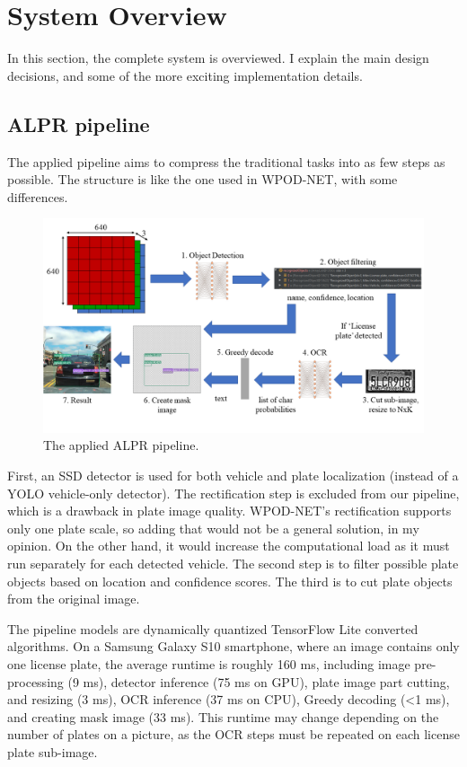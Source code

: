 \chapter{System Overview}

In this section, the complete system is overviewed. I explain the main design decisions, and some of the more exciting implementation details.

\section{ALPR pipeline}

The applied pipeline aims to compress the traditional tasks into as few steps as possible. The structure is like the one used in WPOD-NET\cite{WPOD-NET}, with some differences.

\begin{figure}[htb]
 \centerline{\includegraphics[width=.85\columnwidth]{.//Figure/System/pipeline.PNG}}
 \caption{The applied ALPR pipeline.}
 \label{fig:simple}
\end{figure}

First, an SSD\cite{SSD} detector is used for both vehicle and plate localization (instead of a YOLO\cite{YOLO9000} vehicle-only detector). The rectification step is excluded from our pipeline, which is a drawback in plate image quality. WPOD-NET's rectification supports only one plate scale, so adding that would not be a general solution, in my opinion. On the other hand, it would increase the computational load as it must run separately for each detected vehicle. The second step is to filter possible plate objects based on location and confidence scores. The third is to cut plate objects from the original image.

The pipeline models are dynamically quantized TensorFlow Lite converted algorithms. On a Samsung Galaxy S10 smartphone, where an image contains only one license plate, the average runtime is roughly 160 ms, including image pre-processing (9 ms), detector inference (75 ms on GPU), plate image part cutting, and resizing (3 ms), OCR inference (37 ms on CPU), Greedy decoding (<1 ms), and creating mask image (33 ms). This runtime may change depending on the number of plates on a picture, as the OCR steps must be repeated on each license plate sub-image.

